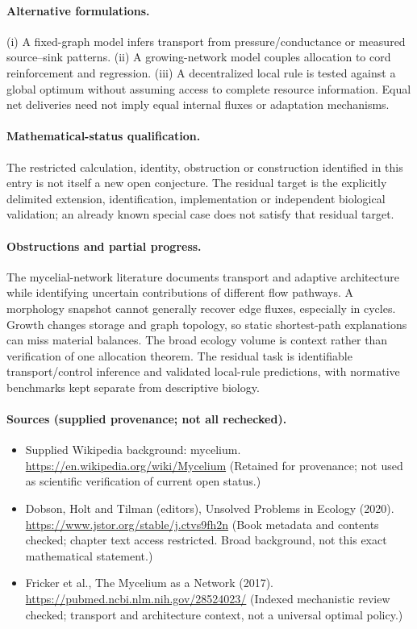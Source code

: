 \documentclass[11pt]{article}
\begin{document}
\paragraph{Alternative formulations.} (i) A fixed-graph model infers transport from pressure/conductance or measured source--sink patterns. (ii) A growing-network model couples allocation to cord reinforcement and regression. (iii) A decentralized local rule is tested against a global optimum without assuming access to complete resource information. Equal net deliveries need not imply equal internal fluxes or adaptation mechanisms.

\paragraph{Mathematical-status qualification.} The restricted calculation, identity, obstruction or construction identified in this entry is not itself a new open conjecture. The residual target is the explicitly delimited extension, identification, implementation or independent biological validation; an already known special case does not satisfy that residual target.

\paragraph{Obstructions and partial progress.} The mycelial-network literature documents transport and adaptive architecture while identifying uncertain contributions of different flow pathways. A morphology snapshot cannot generally recover edge fluxes, especially in cycles. Growth changes storage and graph topology, so static shortest-path explanations can miss material balances. The broad ecology volume is context rather than verification of one allocation theorem. The residual task is identifiable transport/control inference and validated local-rule predictions, with normative benchmarks kept separate from descriptive biology.

\paragraph{Sources (supplied provenance; not all rechecked).} \begin{itemize}
\item Supplied Wikipedia background: mycelium. \url{https://en.wikipedia.org/wiki/Mycelium} (Retained for provenance; not used as scientific verification of current open status.)
\item Dobson, Holt and Tilman (editors), Unsolved Problems in Ecology (2020). \url{https://www.jstor.org/stable/j.ctvs9fh2n} (Book metadata and contents checked; chapter text access restricted. Broad background, not this exact mathematical statement.)
\item Fricker et al., The Mycelium as a Network (2017). \url{https://pubmed.ncbi.nlm.nih.gov/28524023/} (Indexed mechanistic review checked; transport and architecture context, not a universal optimal policy.)
\end{itemize}
\end{document}
